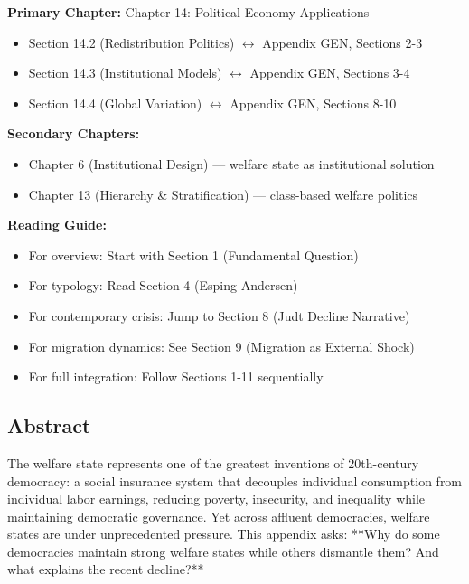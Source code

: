 \begin{tcolorbox}[colback=purple!5!white, colframe=purple!75!black,
    title=Chapter Linkage]

\textbf{Primary Chapter:} Chapter 14: Political Economy Applications
\begin{itemize}[nosep]
\item Section 14.2 (Redistribution Politics) $\leftrightarrow$ Appendix GEN, Sections 2-3
\item Section 14.3 (Institutional Models) $\leftrightarrow$ Appendix GEN, Sections 3-4
\item Section 14.4 (Global Variation) $\leftrightarrow$ Appendix GEN, Sections 8-10
\end{itemize}

\textbf{Secondary Chapters:}
\begin{itemize}[nosep]
\item Chapter 6 (Institutional Design) --- welfare state as institutional solution
\item Chapter 13 (Hierarchy \& Stratification) --- class-based welfare politics
\end{itemize}

\textbf{Reading Guide:}
\begin{itemize}[nosep]
\item For overview: Start with Section 1 (Fundamental Question)
\item For typology: Read Section 4 (Esping-Andersen)
\item For contemporary crisis: Jump to Section 8 (Judt Decline Narrative)
\item For migration dynamics: See Section 9 (Migration as External Shock)
\item For full integration: Follow Sections 1-11 sequentially
\end{itemize}

\end{tcolorbox}

\clearpage


\subsection*{Abstract}

The welfare state represents one of the greatest inventions of 20th-century democracy: a social insurance system that decouples individual consumption from individual labor earnings, reducing poverty, insecurity, and inequality while maintaining democratic governance. Yet across affluent democracies, welfare states are under unprecedented pressure. This appendix asks: **Why do some democracies maintain strong welfare states while others dismantle them? And what explains the recent decline?**


